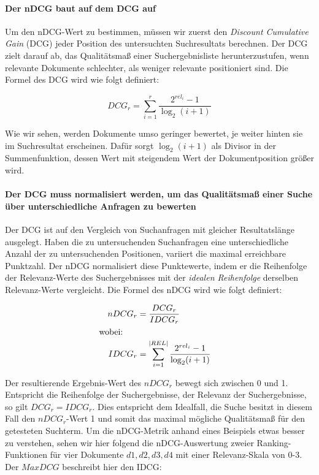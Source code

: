 \paragraph{Der nDCG baut auf dem DCG auf} Um den nDCG-Wert zu bestimmen, müssen wir zuerst den \textit{Discount Cumulative Gain} (DCG) jeder Position des untersuchten Suchresultats berechnen. Der DCG zielt darauf ab, das Qualitätsmaß einer Suchergebnisliste herunterzustufen, wenn relevante Dokumente schlechter, als weniger relevante positioniert sind. Die Formel des DCG wird wie folgt definiert:

\vspace{-1.5em}
\begin{equation}	
DCG_{r} = \sum\limits_{i=1}^r \frac{2^{rel_{i}} - 1}{\log_2(i+1)}
\end{equation}
\vspace{-1em}

Wie wir sehen, werden Dokumente umso geringer bewertet, je weiter hinten sie im Suchresultat erscheinen. Dafür sorgt $\log_2(i+1)$ als Divisor in der Summenfunktion, dessen Wert mit steigendem Wert der Dokumentposition größer wird.

\paragraph{Der DCG muss normalisiert werden, um das Qualitätsmaß einer Suche über unterschiedliche Anfragen zu bewerten}
Der DCG ist auf den Vergleich von Suchanfragen mit gleicher Resultatslänge ausgelegt. Haben die zu untersuchenden Suchanfragen eine unterschiedliche Anzahl der zu untersuchenden Positionen, variiert die maximal erreichbare Punktzahl. Der nDCG normalisiert diese Punktewerte, indem er die Reihenfolge der Relevanz-Werte des Suchergebnisses mit der \textit{idealen Reihenfolge} derselben Relevanz-Werte vergleicht. Die Formel des nDCG wird wie folgt definiert:

\vspace{-.25em}
\begin{spacing}{.25}
\begin{align}
  &&	nDCG_{r} &= \frac{DCG_r}{IDCG_r} &\\
  \intertext{wobei:}
  &&	IDCG_{r} 	&= \sum\limits_{i=1}^{\vert REL \vert} \frac{2^{rel_{i}} - 1}{\log_2(i+1)}
\end{align}
\end{spacing}
\vspace{.5em}

Der resultierende Ergebnis-Wert des $nDCG_r$ bewegt sich zwischen 0 und 1. Entspricht die Reihenfolge der Suchergebnisse, der Relevanz der Suchergebnisse, so gilt $DCG_r = IDCG_r$. Dies entspricht dem Idealfall, die Suche besitzt in diesem Fall den $nDCG_r$-Wert 1 und somit das maximal mögliche Qualitätsmaß für den getesteten Suchterm. Um die nDCG-Metrik anhand eines Beispiels etwas besser zu verstehen, sehen wir hier folgend die nDCG-Auswertung zweier Ranking-Funktionen für vier Dokumente $d1, d2, d3, d4$ mit einer Relevanz-Skala von 0-3. Der $MaxDCG$ beschreibt hier den IDCG:

